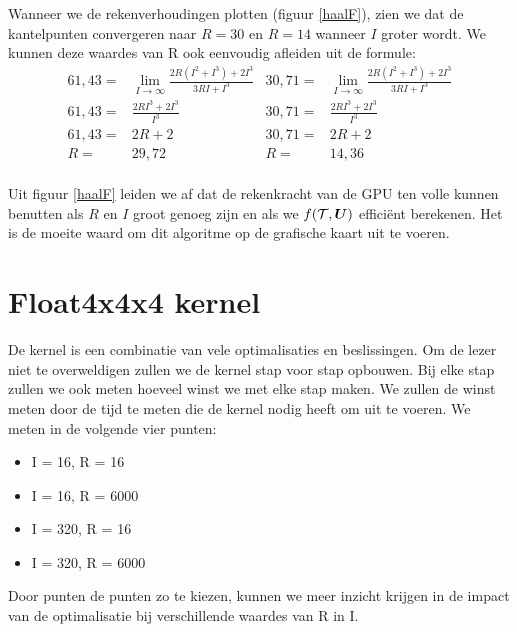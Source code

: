 Wanneer we de rekenverhoudingen plotten (figuur \ref{haalF}), zien we dat de kantelpunten convergeren naar $R = 30$ en $R = 14$ wanneer $I$ groter wordt. We kunnen deze waardes van R ook eenvoudig afleiden uit de formule:
\begin{align*}
    61,43 =& \lim_{I \to \infty} \frac{2R (I^2 + I^3) + 2I^3}{3RI + I^3} &
    30,71 =& \lim_{I \to \infty} \frac{2R (I^2 + I^3) + 2I^3}{3RI + I^3}\\
    61,43 =& \frac{2RI^3 + 2I^3}{I^3} &
    30,71 =& \frac{2RI^3 + 2I^3}{I^3}\\
    61,43 =& 2R + 2 &
    30,71 =& 2R + 2\\
    R =& 29,72 &
    R =& 14,36\\
\end{align*}

Uit figuur \ref{haalF} leiden we af dat de rekenkracht van de GPU ten volle kunnen benutten als $R$ en $I$ groot genoeg zijn en als we $f(\mathcal{T}, \boldsymbol{U})$ effici\"ent berekenen. Het is de moeite waard om dit algoritme op de grafische kaart uit te voeren.



\section{Float4x4x4 kernel}
De kernel is een combinatie van vele optimalisaties en beslissingen. Om de lezer niet te overweldigen zullen we de kernel stap voor stap opbouwen. Bij elke stap zullen we ook meten hoeveel winst we met elke stap maken. We zullen de winst meten door de tijd te meten die de kernel nodig heeft om uit te voeren. We meten in de volgende vier punten:
\begin{itemize}
    \item I = 16, R = 16
    \item I = 16, R = 6000
    \item I = 320, R = 16
    \item I = 320, R = 6000
\end{itemize}
Door punten de punten zo te kiezen, kunnen we meer inzicht krijgen in de impact van de optimalisatie bij verschillende waardes van R in I.


